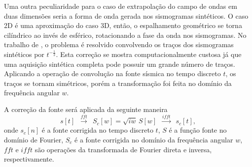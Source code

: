\documentclass[
	12pt,				%
	openright,			%
	oneside,			%
	a4paper,			%
	english,			%
	brazil				%
	]{abntex2}
\begin{document}
	Uma outra peculiaridade para o caso de extrapolação do campo de ondas em duas dimensões seria a forma de onda gerada nos sismogramas sintéticos. O caso 2D é uma aproximação do caso 3D, então, o espalhamento geométrico se torna cilíndrico ao invés de esférico, rotacionando a fase da onda nos sismogramas. No trabalho de , o problema é resolvido convolvendo os traços dos sismogramas sintéticos por $t^{-\frac{1}{2}}$. Esta correção se mostra computacionalmente custosa já que uma aquisição sintética completa pode possuir um grande número de traços. Aplicando a operação de convolução na fonte sísmica no tempo discreto $t$, os traços se tornam simétricos, porém a transformação foi feita no domínio da frequência angular $w$. 
	
	A correção da fonte será aplicada da seguinte maneira  
%	
	\begin{equation}
		s[t] \,\,\, \xrightarrow{fft}\,\,\, S_c[w] = \sqrt{iw}\,S[w]\,\,\,\xrightarrow{ifft}\,\,\, s_c[t], 
	\end{equation}
%	
	\noindent onde $s_c[n]$ é a fonte corrigida no tempo discreto $t$, $S$ é a função fonte no domínio de Fourier, $S_c$ é a fonte corrigida no domínio da frequência angular $w$, $fft$ e $ifft$ são operações da transformada de Fourier direta e inversa, respectivamente. 
	
\end{document}
